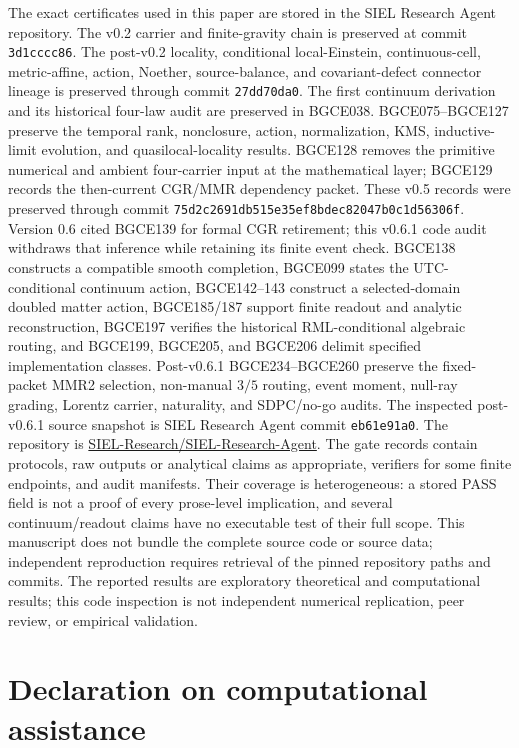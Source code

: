 \documentclass[11pt]{article}
\theoremstyle{definition}
\theoremstyle{remark}
\begin{document}
The exact certificates used in this paper are stored in the SIEL Research Agent repository. The v0.2 carrier and finite-gravity chain is preserved at commit \texttt{3d1cccc86}. The post-v0.2 locality, conditional local-Einstein, continuous-cell, metric-affine, action, Noether, source-balance, and covariant-defect connector lineage is preserved through commit \texttt{27dd70da0}. The first continuum derivation and its historical four-law audit are preserved in BGCE038. BGCE075--BGCE127 preserve the temporal rank, nonclosure, action, normalization, KMS, inductive-limit evolution, and quasilocal-locality results. BGCE128 removes the primitive numerical and ambient four-carrier input at the mathematical layer; BGCE129 records the then-current CGR/MMR dependency packet. These v0.5 records were preserved through commit \texttt{75d2c2691db515e35ef8bdec82047b0c1d56306f}. Version 0.6 cited BGCE139 for formal CGR retirement; this v0.6.1 code audit withdraws that inference while retaining its finite event check. BGCE138 constructs a compatible smooth completion, BGCE099 states the UTC-conditional continuum action, BGCE142--143 construct a selected-domain doubled matter action, BGCE185/187 support finite readout and analytic reconstruction, BGCE197 verifies the historical RML-conditional algebraic routing, and BGCE199, BGCE205, and BGCE206 delimit specified implementation classes. Post-v0.6.1 BGCE234--BGCE260 preserve the fixed-packet MMR2 selection, non-manual $3/5$ routing, event moment, null-ray grading, Lorentz carrier, naturality, and SDPC/no-go audits. The inspected post-v0.6.1 source snapshot is SIEL Research Agent commit \texttt{eb61e91a0}. The repository is
\href{https://github.com/SIEL-Research/SIEL-Research-Agent}{SIEL-Research/SIEL-Research-Agent}.
The gate records contain protocols, raw outputs or analytical claims as appropriate, verifiers for some finite endpoints, and audit manifests. Their coverage is heterogeneous: a stored PASS field is not a proof of every prose-level implication, and several continuum/readout claims have no executable test of their full scope. This manuscript does not bundle the complete source code or source data; independent reproduction requires retrieval of the pinned repository paths and commits. The reported results are exploratory theoretical and computational results; this code inspection is not independent numerical replication, peer review, or empirical validation.

\section*{Declaration on computational assistance}
\end{document}
